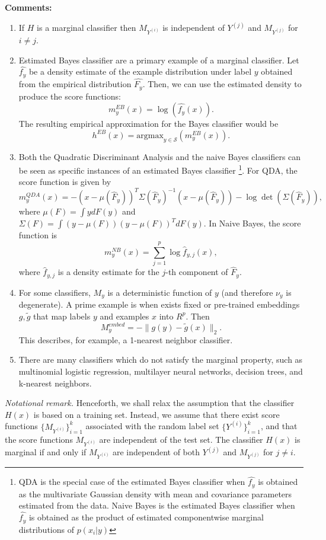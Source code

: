 \documentclass[twoside,11pt]{article}
\begin{document}
\textbf{Comments:}
\begin{enumerate}
\item If $H$ is a marginal classifier then 
$M_{Y^{(i)}}$ is independent of $Y^{(j)}$ and $M_{Y^{(j)}}$ for $i \neq j$.
\item Estimated Bayes
classifier are a primary example of a marginal classifier. Let $\hat{f_y}$ be a density estimate of the example distribution under label $y$ obtained from the
empirical distribution $\hat{F_y}$. Then, we can use the estimated
density to produce the score functions:
\[ m^{EB}_y(x) = \log(\hat{f_{y}}(x)).\]
The resulting empirical approximation for the Bayes classifier would be
\[ h^{EB}(x) = \text{argmax}_{y \in \mathcal{S}}(m^{EB}_y(x)).\]
\item Both the Quadratic Discriminant Analysis and the naive Bayes classifiers can be seen as specific instances of an estimated Bayes classifier
\footnote{QDA is the special case of the estimated Bayes classifier when $\hat{f_y}$ is obtained as
the multivariate Gaussian density with mean and covariance parameters estimated from the data.
Naive Bayes is the estimated Bayes classifier when $\hat{f_y}$ is obtained as the product of estimated componentwise marginal distributions
of $p(x_i|y)$}. 
For QDA, the score function is
given by
\[
m_y^{QDA}(x) = -(x - \mu(\hat{F}_y))^T \Sigma(\hat{F}_y)^{-1} (x-\mu(\hat{F}_y)) - \log\det(\Sigma(\hat{F}_y)),
\]
where $\mu(F) = \int y dF(y)$ and $\Sigma(F) = \int (y-\mu(F))(y-\mu(F))^T dF(y)$.
In Naive Bayes, the score function is
\[
m^{NB}_y(x) = \sum_{j=1}^p \log \hat{f}_{y, j}(x),
\]
where $\hat{f}_{y, j}$ is a density estimate for the $j$-th component of
$\hat{F}_y$.
\item For some classifiers, $M_y$ is a deterministic function of $y$ (and therefore $\nu_y$ is degenerate). A prime example is when exists fixed or pre-trained embeddings $g, \tilde{g}$ that map labels $y$ and examples $x$ into
 $R^p$. Then 
\begin{equation}
M_y^{embed} = -\|g(y) - \tilde{g}(x)\|_2.
\end{equation}
This describes, for example, a 1-nearest neighbor classifier.
\item There are many classifiers which do not satisfy the marginal property, such as multinomial logistic regression, multilayer neural networks, decision trees, and k-nearest neighbors.
\end{enumerate}

\emph{Notational remark.}  Henceforth, we shall relax the assumption that the classifier $H(x)$ is based on a training set.  Instead, we assume that there exist score functions $\{M_{Y^{(i)}}\}_{i=1}^k$ associated with the random label set $\{Y^{(i)}\}_{i=1}^k$, and that the score functions $M_{Y^{(i)}}$ are independent of the test set.  The classifier $H(x)$ is marginal if and only if $M_{Y^{(i)}}$ are independent of both $Y^{(j)}$ and $M_{Y^{(j)}}$ for $j \neq i$.
\end{document}
